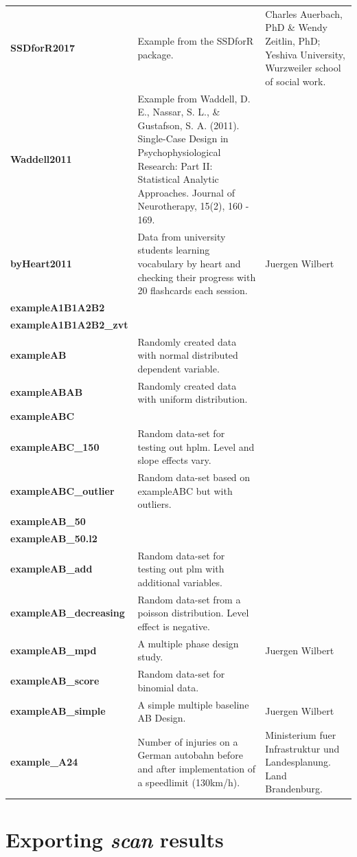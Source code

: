 \documentclass[
]{book}
\begin{document}
\begin{table}
\begin{tabular}[t]{>{\raggedright\arraybackslash}p{7em}>{\raggedright\arraybackslash}p{20em}l}
\textbf{SSDforR2017} & Example from the SSDforR package. & Charles Auerbach, PhD \& Wendy Zeitlin, PhD; Yeshiva University, Wurzweiler school of social work.\\
\textbf{Waddell2011} & Example from Waddell, D. E., Nassar, S. L., \& Gustafson, S. A. (2011). Single-Case Design in Psychophysiological Research: Part II: Statistical Analytic Approaches. Journal of Neurotherapy, 15(2), 160 - 169. & \\
\textbf{byHeart2011} & Data from university students learning vocabulary by heart and checking their progress with 20 flashcards each session. & Juergen Wilbert\\
\textbf{exampleA1B1A2B2} &  & \\
\textbf{exampleA1B1A2B2\_zvt} &  & \\
\textbf{exampleAB} & Randomly created data with normal distributed dependent variable. & \\
\textbf{exampleABAB} & Randomly created data with uniform distribution. & \\
\textbf{exampleABC} &  & \\
\textbf{exampleABC\_150} & Random data-set for testing out hplm. Level and slope effects vary. & \\
\textbf{exampleABC\_outlier} & Random data-set based on exampleABC but with outliers. & \\
\textbf{exampleAB\_50} &  & \\
\textbf{exampleAB\_50.l2} &  & \\
\textbf{exampleAB\_add} & Random data-set for testing out plm with additional variables. & \\
\textbf{exampleAB\_decreasing} & Random data-set from a poisson distribution. Level effect is negative. & \\
\textbf{exampleAB\_mpd} & A multiple phase design study. & Juergen Wilbert\\
\textbf{exampleAB\_score} & Random data-set for binomial data. & \\
\textbf{exampleAB\_simple} & A simple multiple baseline AB Design. & Juergen Wilbert\\
\textbf{example\_A24} & Number of injuries on a German autobahn before and after implementation of a speedlimit (130km/h). & Ministerium fuer Infrastruktur und Landesplanung. Land Brandenburg.\\
\bottomrule
\end{tabular}
\end{table}

\hypertarget{exporting-scan-results}{%
\chapter{\texorpdfstring{Exporting \emph{scan} results}{Exporting scan results}}\label{exporting-scan-results}}
\end{document}
